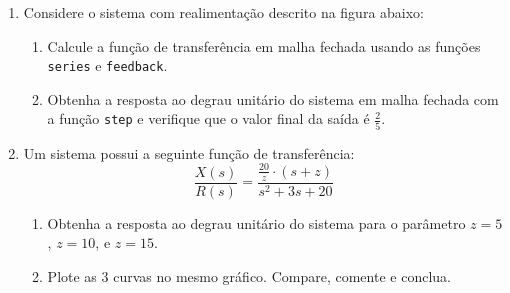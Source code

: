 \documentclass[a4paper,12pt]{article}
\begin{document}
\begin{enumerate}
        \item Considere o sistema com realimentação descrito na figura abaixo:
        \begin{enumerate}
            \item Calcule a função de transferência em malha fechada usando as funções \texttt{series} e \texttt{feedback}.
            \item Obtenha a resposta ao degrau unitário do sistema em malha fechada com a função \texttt{step} e verifique que o valor final da saída é $\frac{2}{5}$.
        \end{enumerate}

        \item Um sistema possui a seguinte função de transferência:
        \begin{equation}
            \frac{X(s)}{R(s)} = \frac{\frac{20}{z} \cdot (s + z)}{s^2 + 3s + 20}
        \end{equation}
        \begin{enumerate}
            \item Obtenha a resposta ao degrau unitário do sistema para o parâmetro \(z = 5\), \(z = 10\), e \(z = 15\).
            \item Plote as 3 curvas no mesmo gráfico. Compare, comente e conclua.
        \end{enumerate}
    \end{enumerate}


    \clearpage
    \printbibliography
\end{document}
